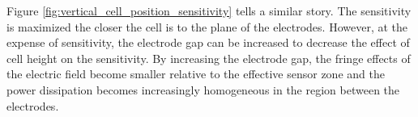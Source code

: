 \par Figure \ref{fig:vertical_cell_position_sensitivity} tells a similar story. The sensitivity is maximized the closer the cell is to the plane of the electrodes. However, at the expense of sensitivity, the electrode gap can be increased to decrease the effect of cell height on the sensitivity. By increasing the electrode gap, the fringe effects of the electric field become smaller relative to the effective sensor zone and the power dissipation becomes increasingly homogeneous in the region between the electrodes. 